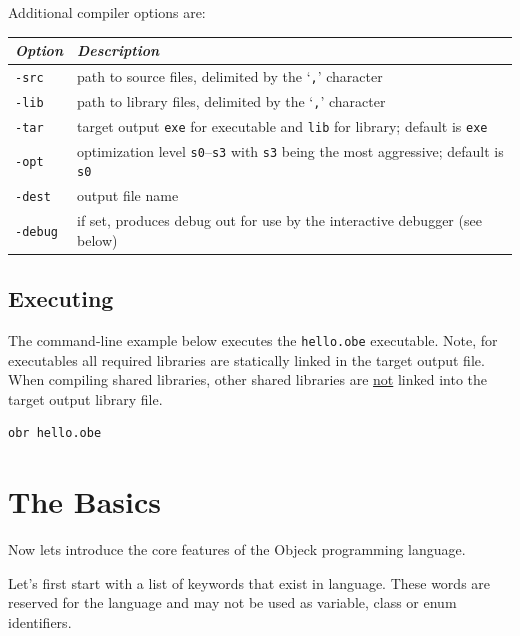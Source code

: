 \documentclass[11pt]{article}
\begin{document}
Additional compiler options are:
\begin{center}
  \begin{tabular}{| l | l |}
    \hline
    \emph{Option} & \emph{Description} \\ \hline \hline
    \texttt{-src} & path to source files, delimited by the `\texttt{,}' character \\ \hline
    \texttt{-lib} & path to library files, delimited by the `\texttt{,}'
    character\\ \hline
    \texttt{-tar} & target output \texttt{exe} for executable and \texttt{lib} for library; default is  \texttt{exe} \\ \hline
    \texttt{-opt} & optimization level \texttt{s0}--\texttt{s3} with \texttt{s3} being the most aggressive; default is \texttt{s0} \\ \hline
    \texttt{-dest} & output file name \\ \hline
    \texttt{-debug} & if set, produces debug out for use by the interactive debugger (see below) \\ \hline
  \end{tabular}
\end{center}

\subsection{Executing}
The command-line example below executes the \texttt{hello.obe}
executable. Note, for executables all required libraries are
statically linked in the target output file.  When compiling shared
libraries, other shared libraries are \underline{not} linked into the
target output library file.

\begin{verbatim}
obr hello.obe
\end{verbatim}

\section{The Basics}
Now lets introduce the core features of the Objeck programming
language.  \vspace{\baselineskip}

Let's first start with a list of keywords that exist in language.
These words are reserved for the language and may not be used as
variable, class or enum identifiers.
\end{document}
